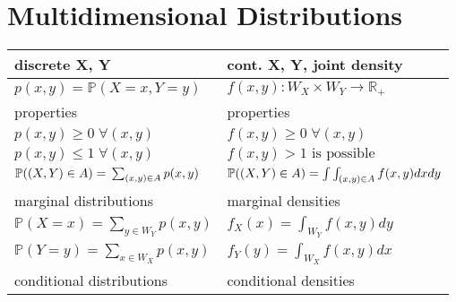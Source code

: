 \section{Multidimensional Distributions}
\renewcommand{\arraystretch}{1.3}
\setlength\tabcolsep{6pt} %
{\small %
    \begin{tabularx}{\linewidth}{X|X}
        discrete X, Y                                                                     & cont. X, Y, joint density                                                \\
        \toprule
        $p(x,y)=\mathbb{P}(X=x,Y=y)$                                                      & $f(x,y)\colon W_X\times W_Y\to\mathbb{R_+}$                              \\
        \midrule
        properties                                                                        & properties                                                               \\
        $p(x,y)\ge0\;\forall(x,y)$                                                        & $f(x,y)\geq0\;\forall(x,y)$                                              \\
        $p(x,y)\le1\;\forall(x,y)$                                                        & $f(x,y)>1\text{ is possible}$                                            \\
        $\mathbb{P}((X,Y)\in A)=\newline\sum_{(x,y)\in A}p(x,y)$                          & $\mathbb{P}((X,Y)\in A)\newline=\int\int_{(x,y)\in A}f(x,y)dxdy$         \\
        \midrule
        marginal distributions                                                            & marginal densities                                                       \\
        $\mathbb P(X=x)=\sum_{y\in W_Y}p(x,y)$                                            & $f_X(x)=\int_{W_Y}f(x,y)dy$                                              \\
        $\mathbb P(Y=y)=\sum_{x\in W_X}p(x,y)$                                            & $f_Y(y)=\int_{W_X}f(x,y)dx$                                              \\
        \midrule
        conditional distributions                                                         & conditional densities                                                    \\

\end{tabularx}}
